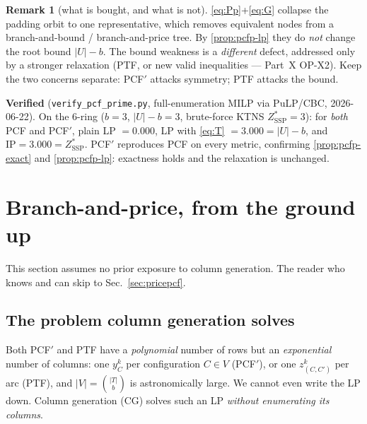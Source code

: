 \documentclass[11pt,a4paper]{article}
\theoremstyle{plain}
\theoremstyle{definition}
\newtheorem{remark}[theorem]{Remark}
\newcommand{\ZSSP}{Z_{\mathrm{SSP}}^{*}}
\begin{document}
\begin{remark}[what is bought, and what is not]\label{rem:bought}
\eqref{eq:Pp}+\eqref{eq:G} collapse the padding orbit to one representative, which removes
equivalent nodes from a branch-and-bound / branch-and-price tree. By
\cref{prop:pcfp-lp} they do \emph{not} change the root bound $|U|-b$. The bound weakness is a
\emph{different} defect, addressed only by a stronger relaxation (PTF, or new valid inequalities
--- Part~X OP-X2). Keep the two concerns separate: PCF$'$ attacks symmetry; PTF attacks the bound.
\end{remark}

\begin{warnbox}
\textbf{Verified} (\texttt{verify\_pcf\_prime.py}, full-enumeration MILP via PuLP/CBC,
2026-06-22). On the $6$-ring ($b{=}3$, $|U|-b=3$, brute-force KTNS $\ZSSP=3$): for \emph{both}
PCF and PCF$'$, plain LP $=0.000$, LP with \eqref{eq:T} $=3.000=|U|-b$, and
$\mathrm{IP}=3.000=\ZSSP$. PCF$'$ reproduces PCF on every metric, confirming
\cref{prop:pcfp-exact} and \cref{prop:pcfp-lp}: exactness holds and the relaxation is unchanged.
\end{warnbox}

\section{Branch-and-price, from the ground up}\label{sec:bp}
This section assumes no prior exposure to column generation. The reader who knows
\citet{Barnhart1998} and \citet{Lubbecke2005} can skip to Sec.~\ref{sec:pricepcf}.

\subsection{The problem column generation solves}
Both PCF$'$ and PTF have a \emph{polynomial} number of rows but an \emph{exponential} number of
columns: one $y_C^k$ per configuration $C\in V$ (PCF$'$), or one $z^k_{(C,C')}$ per arc (PTF),
and $|V|=\binom{|T|}{b}$ is astronomically large. We cannot even write the LP down. Column
generation (CG) solves such an LP \emph{without enumerating its columns}.
\end{document}
